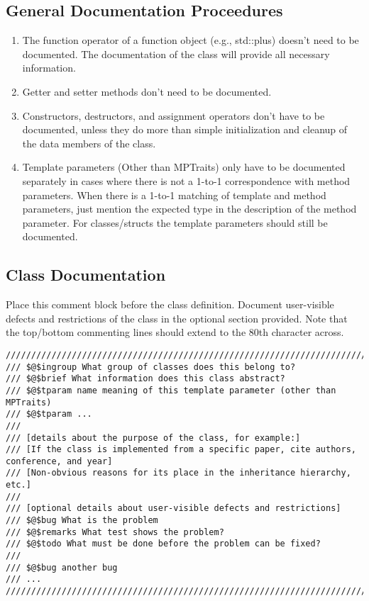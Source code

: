 \documentclass[12pt]{article}
\begin{document}
\subsection{General Documentation Proceedures}

\begin{enumerate}
  \item The function operator of a function object (e.g., std::plus) doesn’t
    need to be documented. The documentation of the class will provide all
    necessary information.
  \item Getter and setter methods don’t need to be documented.
  \item Constructors, destructors, and assignment operators don’t have to be
    documented, unless they do more than simple initialization and cleanup of
    the data members of the class.
  \item Template parameters (Other than MPTraits) only have to be documented
    separately in cases where there is not a 1-to-1 correspondence with method
    parameters. When there is a 1-to-1 matching of template and method
    parameters, just mention the expected type in the description of the method
    parameter. For classes/structs the template parameters should still be
    documented.
\end{enumerate}

\subsection{Class Documentation}

Place this comment block before the class definition. Document user-visible
defects and restrictions of the class in the optional section provided. Note
that the top/bottom commenting lines should extend to the 80th character across.

\begin{lstlisting}[mathescape]
///////////////////////////////////////////////////////////////////////////////
/// $@$ingroup What group of classes does this belong to?
/// $@$brief What information does this class abstract?
/// $@$tparam name meaning of this template parameter (other than MPTraits)
/// $@$tparam ...
///
/// [details about the purpose of the class, for example:]
/// [If the class is implemented from a specific paper, cite authors, conference, and year]
/// [Non-obvious reasons for its place in the inheritance hierarchy, etc.]
///
/// [optional details about user-visible defects and restrictions]
/// $@$bug What is the problem
/// $@$remarks What test shows the problem?
/// $@$todo What must be done before the problem can be fixed?
///
/// $@$bug another bug
/// ...
///////////////////////////////////////////////////////////////////////////////
\end{lstlisting}
\end{document}
